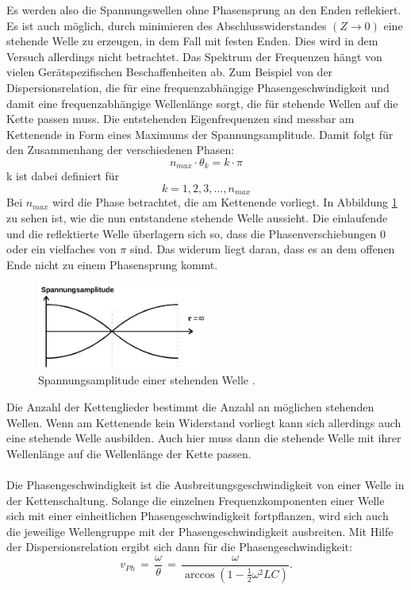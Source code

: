 \documentclass[
  bibliography=totoc,     %
  captions=tableheading,  %
  titlepage=firstiscover, %
]{scrartcl}
\begin{document}
Es werden also die Spannungswellen ohne Phasensprung an den Enden reflekiert.
Es ist auch möglich, durch minimieren des Abschlusswiderstandes $\left( Z \to 0 \right)$
eine stehende Welle zu erzeugen, in dem Fall mit festen Enden. Dies wird in dem
Versuch allerdings nicht betrachtet.
Das Spektrum der Frequenzen hängt von vielen Gerätspezifischen Beschaffenheiten
ab. Zum Beispiel von der Dispersionsrelation, die für eine frequenzabhängige
Phasengeschwindigkeit und damit eine frequenzabhängige Wellenlänge sorgt, die
für stehende Wellen auf die Kette passen muss. Die entstehenden Eigenfrequenzen
sind messbar am Kettenende in Form eines Maximums der Spannungsamplitude. Damit
folgt für den Zusammenhang der verschiedenen Phasen:
\begin{equation}
  n_{max}\cdot\theta_k=k\cdot\pi
\end{equation}
k ist dabei definiert für
\begin{equation}
  k=1,2,3,...,n_{max}
\end{equation}
Bei $n_{max}$ wird die Phase betrachtet, die am Kettenende vorliegt. In
Abbildung \ref{fig:V3567} zu sehen ist, wie die nun entstandene stehende
Welle aussieht. Die einlaufende und die reflektierte Welle überlagern sich so,
dass die Phasenverschiebungen 0 oder ein vielfaches von $\pi$ sind. Das widerum
liegt daran, dass es an dem offenen Ende nicht zu einem Phasensprung kommt.
\begin{figure}[htb]
  \centering
  \includegraphics[width=0.5\textwidth]{V3567.png}
  \caption{Spannungsamplitude einer stehenden Welle \cite{anleitung}.}
  \label{fig:V3567}
\end{figure}
Die Anzahl der Kettenglieder bestimmt die Anzahl an möglichen stehenden Wellen.
Wenn am Kettenende kein Widerstand vorliegt kann sich allerdings auch eine
stehende Welle ausbilden. Auch hier muss dann die stehende Welle mit ihrer
Wellenlänge auf die Wellenlänge der Kette passen. \\
\\
Die Phasengeschwindigkeit ist die Ausbreitungsgeschwindigkeit von einer Welle
in der Kettenschaltung. Solange die einzelnen Frequenzkomponenten einer Welle
sich mit einer einheitlichen Phasengeschwindigkeit fortpflanzen, wird sich auch
die jeweilige Wellengruppe mit der Phasengeschwindigkeit ausbreiten.
Mit Hilfe der Dispersionsrelation ergibt sich dann für die Phasengeschwindigkeit:
\begin{equation}
  v_{Ph}\,=\,\frac{\omega}{\theta}\,=\,\frac{\omega}{\arccos(1-\frac{1}{2}\omega^2LC)}.
  \label{eqn:phasengesch}
\end{equation}
\end{document}
